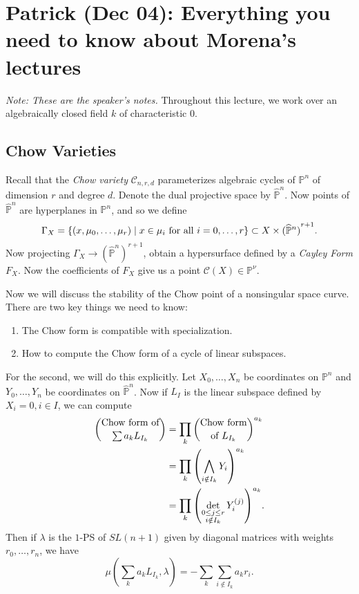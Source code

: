 \documentclass[leqno, openany]{memoir}
\theoremstyle{definition}
\theoremstyle{remark}
\theoremstyle{plain}
\theoremstyle{definition}
\theoremstyle{remark}
\renewcommand{\P}{\mathbb{P}}
\newcommand{\mc}[1]{\mathcal{#1}}
\newcommand{\wh}[1]{\widehat{#1}}
\begin{document}
\chapter{Patrick (Dec 04): Everything you need to know about Morena's
lectures}%

\textit{Note: These are the speaker's notes.} Throughout this lecture, we work
over an algebraically closed field $k$ of characteristic $0$.

\section{Chow Varieties}%

Recall that the \textit{Chow variety} $\mc{C}_{n, r, d}$ parameterizes
algebraic cycles of $\P^n$ of dimension $r$ and degree $d$. Denote the dual
projective space by $\widehat{\P}^n$. Now points of $\widehat{\P}^n$ are
hyperplanes in $\P^n$, and so we define \[ \Gamma_X = \qty{ (x, \mu_0, \ldots,
\mu_r) \mid x \in \mu_i \text{ for all } i = 0, \ldots, r } \subset X \times
{(\widehat{\P}^n)}^{r+1}. \] Now projecting $\Gamma_X \to {(\wh{\P}^n)}^{r+1}$,
obtain a hypersurface defined by a \textit{Cayley Form} $F_X$. Now the
coefficients of $F_X$ give us a point $\mc{C}(X) \in \P^{\nu}$.

Now we will discuss the stability of the Chow point of a nonsingular space
curve. There are two key things we need to know: \begin{enumerate} \item The
    Chow form is compatible with specialization.  \item How to compute the Chow
    form of a cycle of linear subspaces.  \end{enumerate} For the second, we
    will do this explicitly. Let $X_0, \ldots, X_n$ be coordinates on $\P^n$
    and $Y_0, \ldots, Y_n$ be coordinates on $\wh{\P}^n$. Now if $L_I$ is the
    linear subspace defined by $X_i = 0, i \in I$, we can compute
    \begin{align*} \binom{\text{Chow form of}}{\sum a_k L_{I_k}} &= \prod_k
        \binom{\text{Chow form}}{\text{of }L_{I_k}}^{a_k} \\ &= \prod_k
        \qty(\bigwedge_{i \notin I_k} Y_i)^{a_k} \\ &= \prod_k
    \qty(\det_{\substack{0 \leq j \leq r \\ i \notin I_k}} Y_i^{(j)})^{a_k}.
    \end{align*} Then if $\lambda$ is the $1$-PS of $SL(n+1)$ given by diagonal
    matrices with weights $r_0, \ldots, r_n$, we have \[ \mu(\sum_k a_k
    L_{I_k}, \lambda) = - \sum_k \sum_{i \notin I_k} a_k r_i. \]
\end{document}
